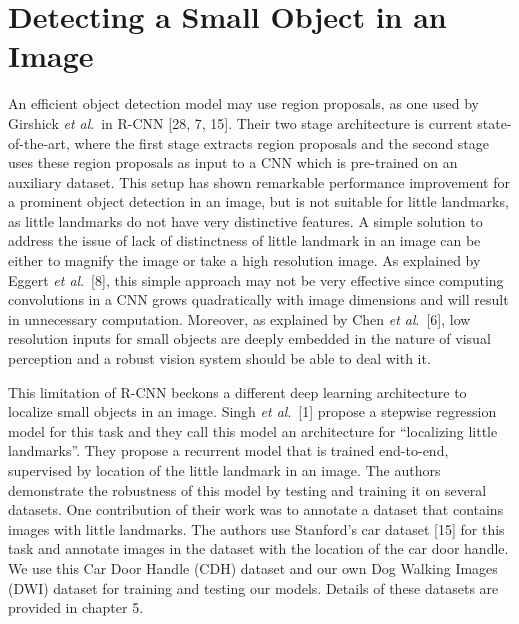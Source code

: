 \documentclass [11pt,letterpaper ,twoside ,openany ]{report}
\begin{document}
    \chapter{Detecting a Small Object in an Image}
    \doublespacing
    An efficient object detection model may use region proposals, as  one used by Girshick \textit{et al}.\ in R-CNN [28, 7, 15]. Their two stage architecture is current state-of-the-art, where the first stage extracts region proposals and the second stage uses these region proposals as input to a CNN which is pre-trained on an auxiliary dataset. This setup has shown remarkable performance improvement for a prominent object detection in an image, but is not suitable for little landmarks, as little landmarks do not have very distinctive features. A simple solution to address the issue of lack of distinctness of little landmark in an image can be either to magnify the image or take a high resolution image. As explained by Eggert \textit{et al}.\ [8], this simple approach may not be very effective since computing convolutions in a CNN grows quadratically with image dimensions and will result in unnecessary computation. Moreover, as explained by Chen \textit{et al}.\ [6], low resolution inputs for small objects are deeply embedded  in the nature of visual perception and a robust vision system should be able to deal with it.
        
    This limitation of R-CNN beckons a different deep learning architecture to localize small objects in an image. Singh \textit{et al}.\ [1] propose a stepwise regression model for this task and they call this model an architecture for ``localizing little landmarks''. They propose a recurrent model that is trained end-to-end, supervised by location of the little landmark in an image. The authors demonstrate the robustness of this model by testing and training it on several datasets. One contribution of their work was to annotate a dataset that contains images with little landmarks. The authors use Stanford's car dataset [15] for this task and annotate images in the dataset with the location of the car door handle. We use this Car Door Handle (CDH) dataset and our own Dog Walking Images (DWI) dataset for training and testing our models. Details of these datasets are provided in chapter 5.
\end{document}
